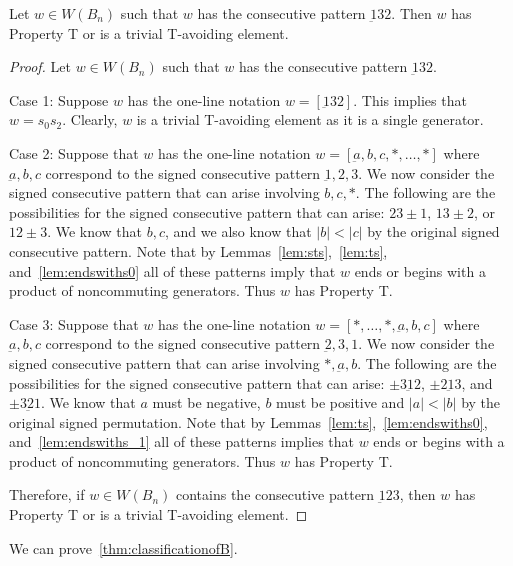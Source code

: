 \begin{lemma}\label{lem:132}
Let $w \in W(B_n)$ such that $w$ has the consecutive pattern $\underbar{1}32$. Then $w$ has Property T or is a trivial T-avoiding element.
\begin{proof}
	Let $w \in W(B_n)$ such that $w$ has the consecutive pattern $\underbar{1}32$.
	
	Case 1: Suppose $w$ has the one-line notation $w=[\underbar{1}32]$. This implies that $w=s_0s_2$. Clearly, $w$ is a trivial T-avoiding element as it is a single generator.
	
	Case 2: Suppose that $w$ has the one-line notation $w=[\underbar{a},b,c, \ast, \ldots, \ast]$ where $\underbar{a},b,c$ correspond to the signed consecutive pattern $\underbar{1},2,3$. We now consider the signed consecutive pattern that can arise involving $b,c, \ast$. The following are the possibilities for the signed consecutive pattern that can arise: $23\pm1$, $13 \pm2$, or $12\pm3$. We know that $b,c$, and we also know that $|b|<|c|$ by the original signed consecutive pattern. Note that by Lemmas~\ref{lem:sts},~\ref{lem:ts}, and~\ref{lem:endswiths0} all of these patterns imply that $w$ ends or begins with a product of noncommuting generators. Thus $w$ has Property T.
	
	Case 3: Suppose that $w$ has the one-line notation $w=[\ast, \ldots, \ast, \underbar{a},b,c]$ where $\underbar{a},b,c$ correspond to the signed consecutive pattern $\underbar{2},3,1$. We now consider the signed consecutive pattern that can arise involving $\ast, \underbar{a}, b$. The following are the possibilities for the signed consecutive pattern that can arise: $\pm3 \underbar{1} 2$, $\pm 2 \underbar{1} 3$, and $\pm 3 \underbar{2} 1$. We know that $a$ must be negative, $b$ must be positive and $|a|<|b|$ by the original signed permutation. Note that by Lemmas~\ref{lem:ts},~\ref{lem:endswiths0}, and~\ref{lem:endswiths_1} all of these patterns implies that $w$ ends or begins with a product of noncommuting generators. Thus $w$ has Property T. 

	Therefore, if $w \in W(B_n)$ contains the consecutive pattern $\underbar{1}23$, then $w$ has Property T or is a trivial T-avoiding element.
\end{proof}	
\end{lemma}

We can prove~\ref{thm:classificationofB}.

